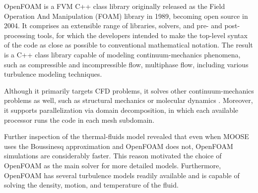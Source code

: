 
OpenFOAM \cite{weller_tensorial_1998} is a \gls*{FVM} C++ class library originally released as the Field Operation And Manipulation (FOAM) library in 1989, becoming open source in 2004.
It comprises an extensible range of libraries, solvers, and pre- and post-processing tools, for which the developers intended to make the top-level syntax of the code as close as possible to conventional mathematical notation.
The result is a C++ class library capable of modeling continuum-mechanics phenomena, such as compressible and incompressible flow, multiphase flow, including various turbulence modeling techniques.

Although it primarily targets \gls*{CFD} problems, it solves other continuum-mechanics problems as well, such as structural mechanics \cite{weller_tensorial_1998} or molecular dynamics \cite{longshaw_mdfoam_2018}.
Moreover, it supports parallelization via domain decomposition, in which each available processor runs the code in each mesh subdomain.

Further inspection of the thermal-fluids model revealed that even when MOOSE uses the Boussinesq approximation and OpenFOAM does not, OpenFOAM simulations are considerably faster.
This reason motivated the choice of OpenFOAM as the main solver for more detailed models.
Furthermore, OpenFOAM has several turbulence models readily available and is capable of solving the density, motion, and temperature of the fluid.

